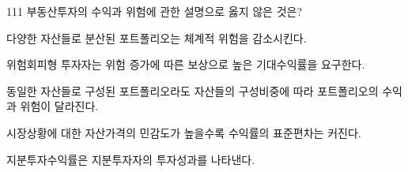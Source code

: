 \begin{question}{111}
부동산투자의 수익과 위험에 관한 설명으로 옳지 않은 것은?
\begin{choices}
  \item 다양한 자산들로 분산된 포트폴리오는 체계적 위험을 감소시킨다.
  \item 위험회피형 투자자는 위험 증가에 따른 보상으로 높은 기대수익률을 요구한다.
  \item 동일한 자산들로 구성된 포트폴리오라도 자산들의 구성비중에 따라 포트폴리오의 수익과 위험이 달라진다.
  \item 시장상황에 대한 자산가격의 민감도가 높을수록 수익률의 표준편차는 커진다.
  \item 지분투자수익률은 지분투자자의 투자성과를 나타낸다.
\end{choices}
\end{question}

